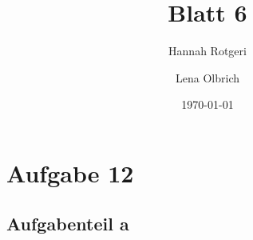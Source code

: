 \documentclass[11pt,a4paper]{article}
\title{Blatt 6}
\date{\today}
\author{Hannah Rotgeri \and Lena Olbrich}
\begin{document}
    \maketitle

    \section*{Aufgabe 12}
\subsection*{Aufgabenteil a}
\end{document}
